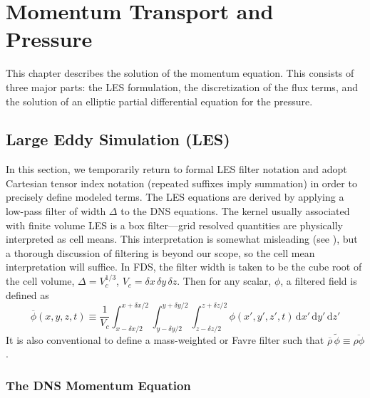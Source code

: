 
\chapter{Momentum Transport and Pressure}
\label{momentum_chapter}

This chapter describes the solution of the momentum equation. This consists of three major parts: the LES formulation, the
discretization of the flux terms, and the solution of an elliptic partial differential equation for the pressure.

\section{Large Eddy Simulation (LES)}
\label{LES}

In this section, we temporarily return to formal LES filter notation and adopt Cartesian tensor index notation (repeated suffixes imply summation) in order to precisely define modeled terms. The LES equations are derived by applying a low-pass filter of width $\Delta$ to the DNS equations. The kernel usually associated with finite volume LES is a box filter---grid resolved quantities are physically interpreted as cell means.  This interpretation is somewhat misleading (see \cite{McDermott:2005b}), but a thorough discussion of filtering is beyond our scope, so the cell mean interpretation will suffice.  In FDS, the filter width is taken to be the cube root of the cell volume, $\Delta = V_c^{1/3}$, $V_c = \delta x \,\delta y\, \delta z$.  Then for any scalar, $\phi$, a filtered field is defined as
\begin{equation}
\label{eqn_box_filter}
\overline{\phi}(x,y,z,t) \equiv \frac{1}{V_c} \int_{x - \delta x/2}^{x + \delta x/2}\int_{y - \delta y/2}^{y + \delta y/2}\int_{z - \delta z/2}^{z + \delta z/2} \phi(x',y',z',t) \,\mbox{d} x' \,\mbox{d} y' \,\mbox{d} z'
\end{equation}
It is also conventional to define a mass-weighted or Favre filter such that $\overline{\rho}\,\widetilde{\phi} \equiv \overline{\rho \phi}$.

\subsection{The DNS Momentum Equation}

